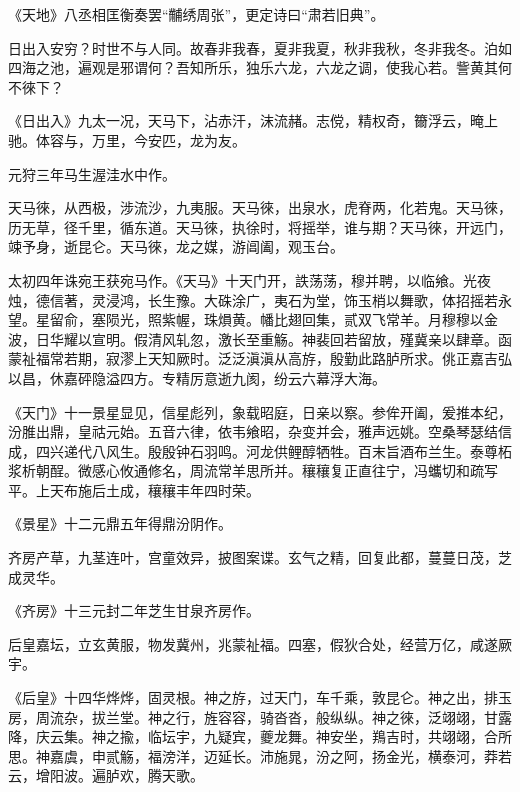 \documentclass[12pt,UTF8]{ctexbook}
\begin{document}
《天地》八丞相匡衡奏罢“黼绣周张”，更定诗曰“肃若旧典”。



日出入安穷？时世不与人同。故春非我春，夏非我夏，秋非我秋，冬非我冬。泊如四海之池，遍观是邪谓何？吾知所乐，独乐六龙，六龙之调，使我心若。訾黄其何不徠下？



《日出入》九太一况，天马下，沾赤汗，沫流赭。志傥，精权奇，籋浮云，晻上驰。体容与，万里，今安匹，龙为友。



元狩三年马生渥洼水中作。



天马徠，从西极，涉流沙，九夷服。天马徠，出泉水，虎脊两，化若鬼。天马徠，历无草，径千里，循东道。天马徠，执徐时，将摇举，谁与期？天马徠，开远门，竦予身，逝昆仑。天马徠，龙之媒，游阊阖，观玉台。



太初四年诛宛王获宛马作。《天马》十天门开，詄荡荡，穆并聘，以临飨。光夜烛，德信著，灵浸鸿，长生豫。大硃涂广，夷石为堂，饰玉梢以舞歌，体招摇若永望。星留俞，塞陨光，照紫幄，珠熉黄。幡比翅回集，贰双飞常羊。月穆穆以金波，日华耀以宣明。假清风轧忽，激长至重觞。神裴回若留放，殣冀亲以肆章。函蒙祉福常若期，寂漻上天知厥时。泛泛滇滇从高斿，殷勤此路胪所求。佻正嘉吉弘以昌，休嘉砰隐溢四方。专精厉意逝九阂，纷云六幕浮大海。



《天门》十一景星显见，信星彪列，象载昭庭，日亲以察。参侔开阖，爰推本纪，汾脽出鼎，皇祜元始。五音六律，依韦飨昭，杂变并会，雅声远姚。空桑琴瑟结信成，四兴递代八风生。殷殷钟石羽鸣。河龙供鲤醇牺牲。百末旨酒布兰生。泰尊柘浆析朝酲。微感心攸通修名，周流常羊思所并。穰穰复正直往宁，冯蠵切和疏写平。上天布施后土成，穰穰丰年四时荣。



《景星》十二元鼎五年得鼎汾阴作。



齐房产草，九茎连叶，宫童效异，披图案谍。玄气之精，回复此都，蔓蔓日茂，芝成灵华。



《齐房》十三元封二年芝生甘泉齐房作。



后皇嘉坛，立玄黄服，物发冀州，兆蒙祉福。四塞，假狄合处，经营万亿，咸遂厥宇。



《后皇》十四华烨烨，固灵根。神之斿，过天门，车千乘，敦昆仑。神之出，排玉房，周流杂，拔兰堂。神之行，旌容容，骑沓沓，般纵纵。神之徠，泛翊翊，甘露降，庆云集。神之揄，临坛宇，九疑宾，夔龙舞。神安坐，鴹吉时，共翊翊，合所思。神嘉虞，申贰觞，福滂洋，迈延长。沛施晁，汾之阿，扬金光，横泰河，莽若云，增阳波。遍胪欢，腾天歌。
\end{document}

